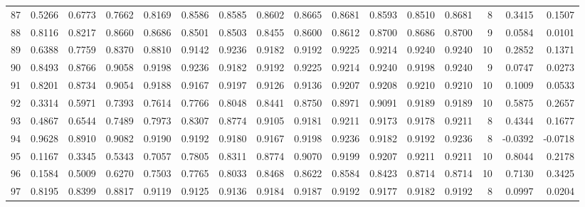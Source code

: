 \begin{tabular}{lrrrrrrrrrrrrrrr}
87  &      0.5266 &  0.6773 &  0.7662 &  0.8169 &  0.8586 &  0.8585 &  0.8602 &  0.8665 &  0.8681 &  0.8593 &   0.8510 &     0.8681 &      8 &                    0.3415 &                     0.1507 \\
88  &      0.8116 &  0.8217 &  0.8660 &  0.8686 &  0.8501 &  0.8503 &  0.8455 &  0.8600 &  0.8612 &  0.8700 &   0.8686 &     0.8700 &      9 &                    0.0584 &                     0.0101 \\
89  &      0.6388 &  0.7759 &  0.8370 &  0.8810 &  0.9142 &  0.9236 &  0.9182 &  0.9192 &  0.9225 &  0.9214 &   0.9240 &     0.9240 &     10 &                    0.2852 &                     0.1371 \\
90  &      0.8493 &  0.8766 &  0.9058 &  0.9198 &  0.9236 &  0.9182 &  0.9192 &  0.9225 &  0.9214 &  0.9240 &   0.9198 &     0.9240 &      9 &                    0.0747 &                     0.0273 \\
91  &      0.8201 &  0.8734 &  0.9054 &  0.9188 &  0.9167 &  0.9197 &  0.9126 &  0.9136 &  0.9207 &  0.9208 &   0.9210 &     0.9210 &     10 &                    0.1009 &                     0.0533 \\
92  &      0.3314 &  0.5971 &  0.7393 &  0.7614 &  0.7766 &  0.8048 &  0.8441 &  0.8750 &  0.8971 &  0.9091 &   0.9189 &     0.9189 &     10 &                    0.5875 &                     0.2657 \\
93  &      0.4867 &  0.6544 &  0.7489 &  0.7973 &  0.8307 &  0.8774 &  0.9105 &  0.9181 &  0.9211 &  0.9173 &   0.9178 &     0.9211 &      8 &                    0.4344 &                     0.1677 \\
94  &      0.9628 &  0.8910 &  0.9082 &  0.9190 &  0.9192 &  0.9180 &  0.9167 &  0.9198 &  0.9236 &  0.9182 &   0.9192 &     0.9236 &      8 &                   -0.0392 &                    -0.0718 \\
95  &      0.1167 &  0.3345 &  0.5343 &  0.7057 &  0.7805 &  0.8311 &  0.8774 &  0.9070 &  0.9199 &  0.9207 &   0.9211 &     0.9211 &     10 &                    0.8044 &                     0.2178 \\
96  &      0.1584 &  0.5009 &  0.6270 &  0.7503 &  0.7765 &  0.8033 &  0.8468 &  0.8622 &  0.8584 &  0.8423 &   0.8714 &     0.8714 &     10 &                    0.7130 &                     0.3425 \\
97  &      0.8195 &  0.8399 &  0.8817 &  0.9119 &  0.9125 &  0.9136 &  0.9184 &  0.9187 &  0.9192 &  0.9177 &   0.9182 &     0.9192 &      8 &                    0.0997 &                     0.0204 \\

\end{tabular}
